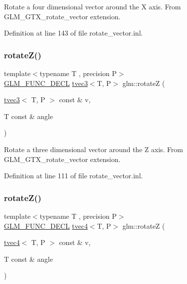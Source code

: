 Rotate a four dimensional vector around the X axis. From G\+L\+M\+\_\+\+G\+T\+X\+\_\+rotate\+\_\+vector extension. 

Definition at line 143 of file rotate\+\_\+vector.\+inl.

\mbox{\label{group__gtx__rotate__vector_gae30ac01b89d4f16a972fee696c964908}} 
\subsubsection{\texorpdfstring{rotateZ()}{rotateZ()}\hspace{0.1cm}{\footnotesize\ttfamily [1/2]}}
{\footnotesize\ttfamily template$<$typename T , precision P$>$ \\
\mbox{\hyperlink{setup_8hpp_ab2d052de21a70539923e9bcbf6e83a51}{G\+L\+M\+\_\+\+F\+U\+N\+C\+\_\+\+D\+E\+CL}} \mbox{\hyperlink{structglm_1_1tvec3}{tvec3}}$<$T, P$>$ glm\+::rotateZ (\begin{DoxyParamCaption}\item[{\mbox{\hyperlink{structglm_1_1tvec3}{tvec3}}$<$ T, P $>$ const \&}]{v,  }\item[{T const \&}]{angle }\end{DoxyParamCaption})}

Rotate a three dimensional vector around the Z axis. From G\+L\+M\+\_\+\+G\+T\+X\+\_\+rotate\+\_\+vector extension. 

Definition at line 111 of file rotate\+\_\+vector.\+inl.

\mbox{\label{group__gtx__rotate__vector_ga034e5d197ab4bd8685624bc2cf16e586}} 
\subsubsection{\texorpdfstring{rotateZ()}{rotateZ()}\hspace{0.1cm}{\footnotesize\ttfamily [2/2]}}
{\footnotesize\ttfamily template$<$typename T , precision P$>$ \\
\mbox{\hyperlink{setup_8hpp_ab2d052de21a70539923e9bcbf6e83a51}{G\+L\+M\+\_\+\+F\+U\+N\+C\+\_\+\+D\+E\+CL}} \mbox{\hyperlink{structglm_1_1tvec4}{tvec4}}$<$T, P$>$ glm\+::rotateZ (\begin{DoxyParamCaption}\item[{\mbox{\hyperlink{structglm_1_1tvec4}{tvec4}}$<$ T, P $>$ const \&}]{v,  }\item[{T const \&}]{angle }\end{DoxyParamCaption})}

